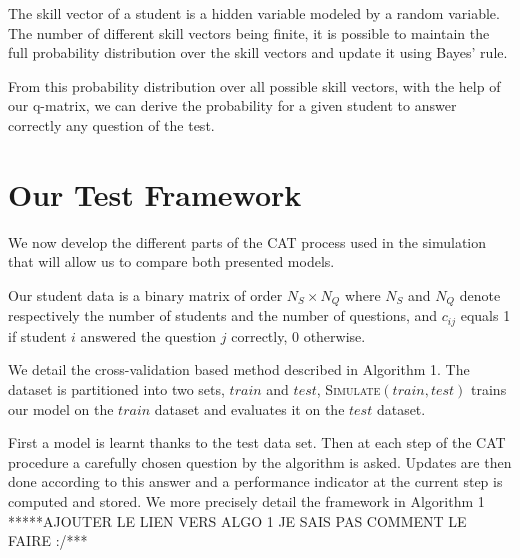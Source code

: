 \documentclass{sig-alternate}
\begin{document}
The skill vector of a student is a hidden variable modeled by a random variable. The number of different skill vectors being finite, it is possible to maintain the full probability distribution over the skill vectors and update it using Bayes' rule.

From this probability distribution over all possible skill vectors, with the help of our q-matrix, we can derive the probability for a given student to answer correctly any question of the test.



\section{Our Test Framework}

We now develop the different parts of the CAT process used in the simulation that will allow us to compare both presented models.

Our student data is a binary matrix of order $N_S \times N_Q$ where $N_S$ and $N_Q$ denote respectively the number of students and the number of questions, and $c_{ij}$ equals 1 if student $i$ answered the question $j$ correctly, 0 otherwise. 

We detail the cross-validation based method described in Algorithm 1. The dataset is partitioned into two sets, $train$ and $test$, \textsc{Simulate}$(train, test)$ trains our model on the $train$ dataset and evaluates it on the $test$ dataset.

First a model is learnt thanks to the test data set. Then at each step of the CAT procedure a carefully chosen question by the algorithm is asked. Updates are then done according to this answer and a performance indicator at the current step is computed and stored. We more precisely detail the framework in Algorithm 1 *****AJOUTER LE LIEN VERS ALGO 1 JE SAIS PAS COMMENT LE FAIRE :/***
\end{document}
